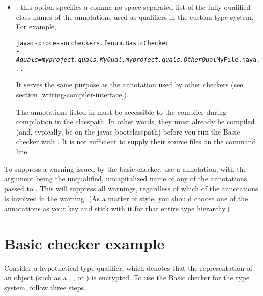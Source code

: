 \begin{itemize}

\item
{}: this option specifies a comma-no-space-separated list of
the fully-qualified class
names of the annotations used as qualifiers in the custom type system.  For
example,

\begin{alltt}
  javac -processor checkers.fenum.BasicChecker
        \textit{-Aquals=myproject.quals.MyQual,myproject.quals.OtherQual} MyFile.java ...
\end{alltt}

It serves the same purpose as the 
annotation used by other checkers (see section
\ref{writing-compiler-interface}).

The annotations listed in  must be accessible to
the compiler during compilation in the classpath.  In other words, they must
already be compiled (and, typically, be on the javac bootclasspath)
before you run the Basic checker with .  It
is not sufficient to supply their source files on the command line.

\end{itemize}

To suppress a warning issued by the basic checker, use a 
annotation, with the argument being the unqualified, uncapitalized name of
any of the annotations passed to .  This will suppress all
warnings, regardless of which of the annotations is involved in the
warning.  (As a matter of style, you should choose one of the annotations
as your  key and stick with it for that entire type
hierarchy.)


\section{Basic checker example\label{basic-example}\label{encrypted-example}}

Consider a hypothetical  type qualifier, which denotes that the
representation of an object (such as a , , or
) is encrypted. To use the Basic checker for the 
type system, follow three steps.

